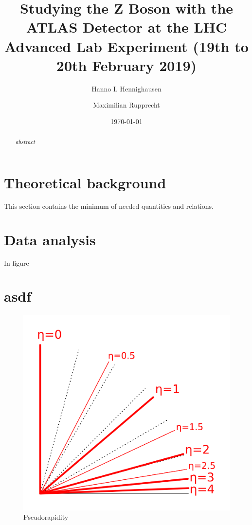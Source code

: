 \documentclass[twocolumn,11pt]{asme2ej}
\title{Studying the Z Boson with the ATLAS Detector at the LHC\\
\large Advanced Lab Experiment (19th to 20th February 2019)}
\date{\today}
\author{Hanno I. Hennighausen
    \affiliation{
	BSc student, Heidelberg University
    }	
}
\author{Maximilian Rupprecht
    \affiliation{ BSc student, Heidelberg University
    }
}
\begin{document}
\maketitle    
\setcounter{page}{1}
\begin{abstract}
{\it abstract
}
\end{abstract}


\section{Theoretical background}

This section contains the minimum of needed quantities and relations. 

\section{Data analysis}
In figure 


\section{asdf}
\begin{figure}[h]
	\begin{center}
		\setlength{\unitlength}{0.012500in}%
		\includegraphics[width=\linewidth]{figures/pseudorapidity}
	\end{center}
\caption{Pseudorapidity}
\label{Pseudorapidity} 
\end{figure}
\end{document}
